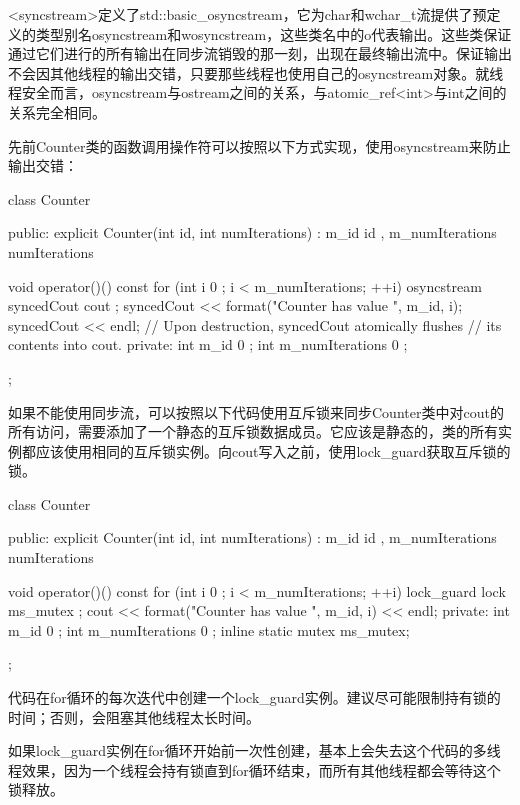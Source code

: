 <syncstream>定义了std::basic\_osyncstream，它为char和wchar\_t流提供了预定义的类型别名osyncstream和wosyncstream，这些类名中的o代表输出。这些类保证通过它们进行的所有输出在同步流销毁的那一刻，出现在最终输出流中。保证输出不会因其他线程的输出交错，只要那些线程也使用自己的osyncstream对象。就线程安全而言，osyncstream与ostream之间的关系，与atomic\_ref<int>与int之间的关系完全相同。

先前Counter类的函数调用操作符可以按照以下方式实现，使用osyncstream来防止输出交错：

\begin{cpp}
class Counter
{
    public:
        explicit Counter(int id, int numIterations)
            : m_id { id }, m_numIterations { numIterations } { }

        void operator()() const
        {
            for (int i { 0 }; i < m_numIterations; ++i) {
                osyncstream syncedCout { cout };
                syncedCout << format("Counter {} has value {}", m_id, i);
                syncedCout << endl;
                // Upon destruction, syncedCout atomically flushes
                // its contents into cout.
            }
        }
    private:
        int m_id { 0 };
        int m_numIterations { 0 };
};
\end{cpp}


如果不能使用同步流，可以按照以下代码使用互斥锁来同步Counter类中对cout的所有访问，需要添加了一个静态的互斥锁数据成员。它应该是静态的，类的所有实例都应该使用相同的互斥锁实例。向cout写入之前，使用lock\_guard获取互斥锁的锁。

\begin{cpp}
class Counter
{
    public:
        explicit Counter(int id, int numIterations)
            : m_id { id }, m_numIterations { numIterations } { }

        void operator()() const
        {
            for (int i { 0 }; i < m_numIterations; ++i) {
                lock_guard lock { ms_mutex };
                cout << format("Counter {} has value {}", m_id, i) << endl;
            }
        }
    private:
        int m_id { 0 };
        int m_numIterations { 0 };
        inline static mutex ms_mutex;
};
\end{cpp}

代码在for循环的每次迭代中创建一个lock\_guard实例。建议尽可能限制持有锁的时间；否则，会阻塞其他线程太长时间。

如果lock\_guard实例在for循环开始前一次性创建，基本上会失去这个代码的多线程效果，因为一个线程会持有锁直到for循环结束，而所有其他线程都会等待这个锁释放。

